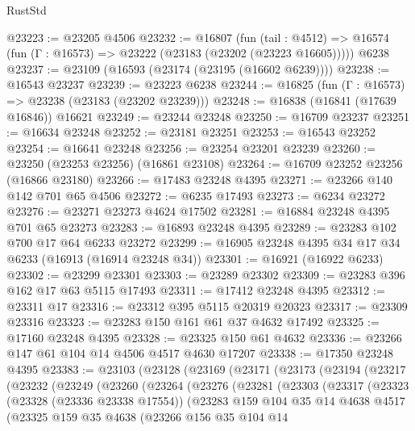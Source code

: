 \begin{lexlean}{RustStd}
\begin{coremodule}
@23223 := @23205 @4506
@23232 := @16807
    (fun (tail : @4512) => @16574 (fun (Γ : @16573) => @23222 (@23183 (@23202 (@23223 @16605)))))
    @6238
@23237 := @23109 (@16593 (@23174 (@23195 (@16602 @6239))))
@23238 := @16543 @23237
@23239 := @23223 @6238
@23244 := @16825 (fun (Γ : @16573) => @23238 (@23183 (@23202 @23239)))
@23248 := @16838 (@16841 (@17639 @16846)) @16621
@23249 := @23244 @23248
@23250 := @16709 @23237
@23251 := @16634 @23248
@23252 := @23181 @23251
@23253 := @16543 @23252
@23254 := @16641 @23248
@23256 := @23254 @23201 @23239
@23260 := @23250 (@23253 @23256) (@16861 @23108)
@23264 := @16709 @23252 @23256 (@16866 @23180)
@23266 := @17483 @23248 @4395
@23271 := @23266 @140 @142 @701 @65 @4506
@23272 := @6235 @17493
@23273 := @6234 @23272
@23276 := @23271 @23273 @4624 @17502
@23281 := @16884 @23248 @4395 @701 @65 @23273
@23283 := @16893 @23248 @4395
@23289 := @23283 @102 @700 @17 @64 @6233 @23272
@23299 := @16905 @23248 @4395 @34 @17 @34 @6233 (@16913 (@16914 @23248 @34))
@23301 := @16921 (@16922 @6233)
@23302 := @23299 @23301
@23303 := @23289 @23302
@23309 := @23283 @396 @162 @17 @63 @5115 @17493
@23311 := @17412 @23248 @4395
@23312 := @23311 @17
@23316 := @23312 @395 @5115 @20319 @20323
@23317 := @23309 @23316
@23323 := @23283 @150 @161 @61 @37 @4632 @17492
@23325 := @17160 @23248 @4395
@23328 := @23325 @150 @61 @4632
@23336 := @23266 @147 @61 @104 @14 @4506 @4517 @4630 @17207
@23338 := @17350 @23248 @4395
@23383 := @23103
    (@23128
      (@23169
        (@23171
          (@23173
            (@23194
              (@23217
                (@23232
                  (@23249
                    (@23260
                      (@23264
                        (@23276
                          (@23281
                            (@23303
                              (@23317
                                (@23323
                                  (@23328 (@23336 @23338 @17554))
                                  (@23283
                                    @159
                                    @104
                                    @35
                                    @14
                                    @4638
                                    @4517
                                    (@23325
                                      @159
                                      @35
                                      @4638
                                      (@23266
                                        @156
                                        @35
                                        @104
                                        @14

\end{coremodule}
\end{lexlean}

